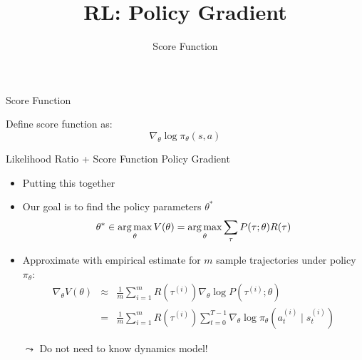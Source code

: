 


\title[Reinforcement Learning: Big Picture]{RL: Policy Gradient}
\subtitle{Score Function}




	
	\maketitle

\begin{frame}[c]{Score Function}


Define score function as:
$$\nabla_\theta \log \pi_\theta (s,a) $$


\end{frame}
\begin{frame}[c]{Likelihood Ratio + Score Function Policy Gradient}
	
	\begin{itemize}
		\item Putting this together
		\item Our goal is to find the policy parameters $\theta^*$
		$$\theta^* \in \operatorname*{arg\,max}_{\theta} V(\theta) = \operatorname*{arg\,max}_{\theta}\sum_{\tau} P(\tau; \theta) R(\tau) $$
		\item Approximate with empirical estimate for $m$ sample trajectories under
		policy $\pi_\theta$:
		\begin{eqnarray}
		\nabla_\theta V(\theta) &\approx& \frac{1}{m} \sum_{i=1}^{m} R(\tau^{(i)}) \nabla_\theta \log P(\tau^{(i)}; \theta) \nonumber\\
		&=& \frac{1}{m} \sum_{i=1}^{m} R(\tau^{(i)}) \sum_{t=0}^{T-1} \nabla_\theta \log \pi_\theta (a_t^{(i)} \mid s_t^{(i)})
		\end{eqnarray}
		\item[$\leadsto$] Do not need to know dynamics model!
		
	\end{itemize}
	
\end{frame}
